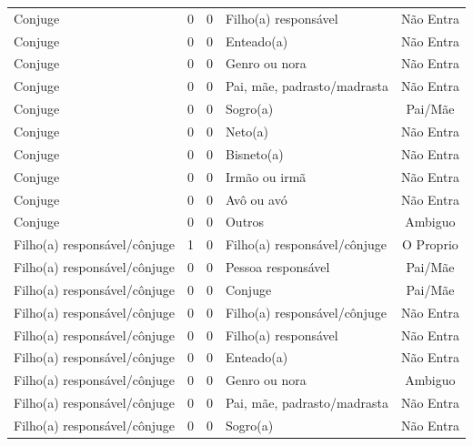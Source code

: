 \documentclass[
	12pt,				%
	openright,			%
	twoside,			%
	a4paper,			%
	english,			%
	french,				%
	spanish,			%
	brazil				%
	]{abntex2}
\begin{document}
\begin{anexosenv}
\begin{longtable}{@{}lcclc@{}}
Conjuge                      & 0         & 0        & Filho(a) responsável         & Não Entra       \\
Conjuge                      & 0         & 0        & Enteado(a)                   & Não Entra       \\
Conjuge                      & 0         & 0        & Genro ou nora                & Não Entra       \\
Conjuge                      & 0         & 0        & Pai, mãe, padrasto/madrasta  & Não Entra       \\
Conjuge                      & 0         & 0        & Sogro(a)                     & Pai/Mãe         \\
Conjuge                      & 0         & 0        & Neto(a)                      & Não Entra       \\
Conjuge                      & 0         & 0        & Bisneto(a)                   & Não Entra       \\
Conjuge                      & 0         & 0        & Irmão ou irmã                & Não Entra       \\
Conjuge                      & 0         & 0        & Avô ou avó                   & Não Entra       \\
Conjuge                      & 0         & 0        & Outros                       & Ambiguo         \\
Filho(a) responsável/cônjuge & 1         & 0        & Filho(a) responsável/cônjuge & O Proprio       \\
Filho(a) responsável/cônjuge & 0         & 0        & Pessoa responsável           & Pai/Mãe         \\
Filho(a) responsável/cônjuge & 0         & 0        & Conjuge                      & Pai/Mãe         \\
Filho(a) responsável/cônjuge & 0         & 0        & Filho(a) responsável/cônjuge & Não Entra       \\
Filho(a) responsável/cônjuge & 0         & 0        & Filho(a) responsável         & Não Entra       \\
Filho(a) responsável/cônjuge & 0         & 0        & Enteado(a)                   & Não Entra       \\
Filho(a) responsável/cônjuge & 0         & 0        & Genro ou nora                & Ambiguo         \\
Filho(a) responsável/cônjuge & 0         & 0        & Pai, mãe, padrasto/madrasta  & Não Entra       \\
Filho(a) responsável/cônjuge & 0         & 0        & Sogro(a)                     & Não Entra       \\

\end{longtable}
\end{anexosenv}
\end{document}
